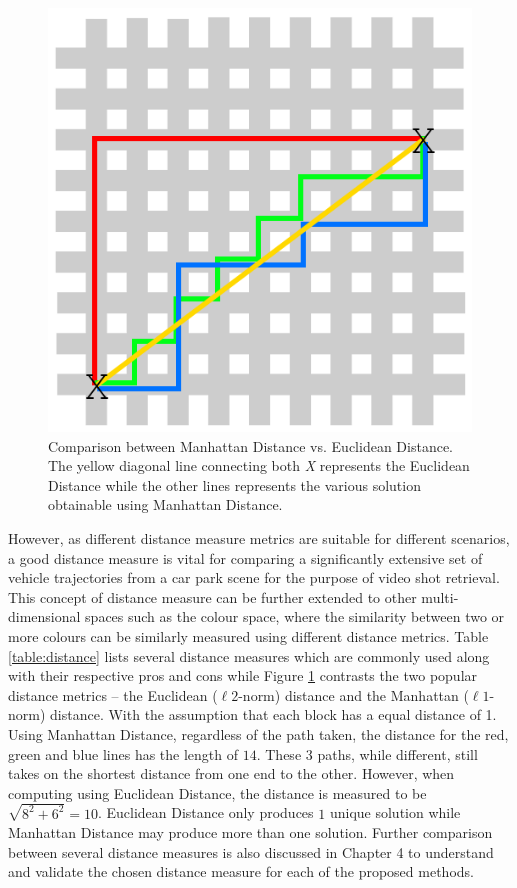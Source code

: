 \begin{figure}[hbt!]
 \centering
 \includegraphics[width=.5\textwidth]{image/lit/manhattan.png}
 \caption[Comparison between Manhattan Distance vs. Euclidean Distance]{Comparison between Manhattan Distance vs. Euclidean Distance. The yellow diagonal line connecting both \emph{X} represents the Euclidean Distance while the other lines represents the various solution obtainable using Manhattan Distance.}
 \label{fig:manhattan}
\end{figure}

However, as different distance measure metrics are suitable for different
scenarios, a good distance measure is vital for comparing a significantly
extensive set of vehicle trajectories from a car park scene for the purpose of video shot retrieval. This concept of distance measure can be further extended to other
multi-dimensional spaces such as the colour space, where the similarity between
two or more colours can be similarly measured using different distance metrics. 
Table \ref{table:distance} lists several
distance measures which are commonly used along with their respective pros and cons while Figure \ref{fig:manhattan} contrasts the two popular distance metrics -- the Euclidean ($\ell 2$-norm) distance and the Manhattan ($\ell 1$-norm) distance. 
With the assumption that each block has a equal distance of 1. Using Manhattan Distance, regardless of the path taken, the distance for the red, green and  blue lines has the length of $14$. These 3 paths, while different, still takes on the shortest distance from one end to the other. However, when computing using Euclidean Distance, the distance is measured to be $\sqrt{8^2 + 6^2} = 10$. Euclidean Distance only produces $1$ unique solution while Manhattan Distance may produce more than one solution.
Further comparison between several distance measures is
also discussed in Chapter 4 to understand and validate the chosen distance
measure for each of the proposed methods.

